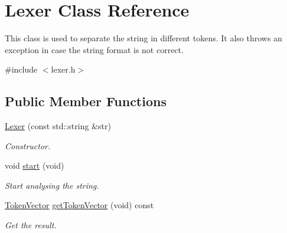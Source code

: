 \hypertarget{class_lexer}{}\section{Lexer Class Reference}
\label{class_lexer}


This class is used to separate the string in different tokens. It also throws an exception in case the string format is not correct.  




{\ttfamily \#include $<$lexer.\+h$>$}

\subsection*{Public Member Functions}
\begin{DoxyCompactItemize}
\item 
\hyperlink{class_lexer_a643965a215d7b8f84be82239465fea5f}{Lexer} (const std\+::string \&str)
\begin{DoxyCompactList}\small\item\em Constructor. \end{DoxyCompactList}\item 
\hypertarget{class_lexer_a38b525bdff5c3f3aca8c19838b480086}{}void \hyperlink{class_lexer_a38b525bdff5c3f3aca8c19838b480086}{start} (void)\label{class_lexer_a38b525bdff5c3f3aca8c19838b480086}

\begin{DoxyCompactList}\small\item\em Start analysing the string. \end{DoxyCompactList}\item 
\hyperlink{token_8h_ab47f31774188c3fad94acfd21e12c917}{Token\+Vector} \hyperlink{class_lexer_ad590d7968a57fdbe5bc1df94364851e8}{get\+Token\+Vector} (void) const 
\begin{DoxyCompactList}\small\item\em Get the result. \end{DoxyCompactList}\end{DoxyCompactItemize}

